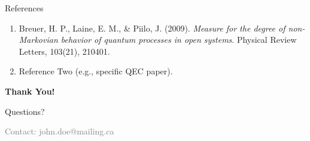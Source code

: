 \documentclass[10pt]{beamer}
\begin{document}
\begin{frame}{References}
    \vspace{0.2cm}
    \begin{enumerate}
        \item[\textbf{[1]}] Breuer, H. P., Laine, E. M., \& Piilo, J. (2009). \textit{Measure for the degree of non-Markovian behavior of quantum processes in open systems}. Physical Review Letters, 103(21), 210401.
        \vspace{0.2cm}
        \item[\textbf{[2]}] Reference Two (e.g., specific QEC paper).
    \end{enumerate}
\end{frame}

\begin{frame}[plain]
    \centering
    \vspace{2cm}
    {\Huge \textbf{Thank You!}}
    
    \vspace{1cm}
    {\Large Questions?}
    
    \vfill
    \scriptsize \textcolor{gray}{Contact: john.doe@mailing.ca}
\end{frame}
\end{document}
